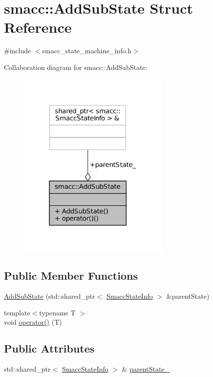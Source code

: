 \hypertarget{structsmacc_1_1AddSubState}{}\section{smacc\+:\+:Add\+Sub\+State Struct Reference}
\label{structsmacc_1_1AddSubState}


{\ttfamily \#include $<$smacc\+\_\+state\+\_\+machine\+\_\+info.\+h$>$}



Collaboration diagram for smacc\+:\+:Add\+Sub\+State\+:
\nopagebreak
\begin{figure}[H]
\begin{center}
\leavevmode
\includegraphics[width=214pt]{structsmacc_1_1AddSubState__coll__graph}
\end{center}
\end{figure}
\subsection*{Public Member Functions}
\begin{DoxyCompactItemize}
\item 
\hyperlink{structsmacc_1_1AddSubState_a2110c7ebd1833484f328bed15e1a988c}{Add\+Sub\+State} (std\+::shared\+\_\+ptr$<$ \hyperlink{classsmacc_1_1SmaccStateInfo}{Smacc\+State\+Info} $>$ \&parent\+State)
\item 
{\footnotesize template$<$typename T $>$ }\\void \hyperlink{structsmacc_1_1AddSubState_a24b6d9a40ca08289e36562d26f1b863c}{operator()} (T)
\end{DoxyCompactItemize}
\subsection*{Public Attributes}
\begin{DoxyCompactItemize}
\item 
std\+::shared\+\_\+ptr$<$ \hyperlink{classsmacc_1_1SmaccStateInfo}{Smacc\+State\+Info} $>$ \& \hyperlink{structsmacc_1_1AddSubState_a24aaa4e3dbe9722ce100f24b73207cd6}{parent\+State\+\_\+}
\end{DoxyCompactItemize}


